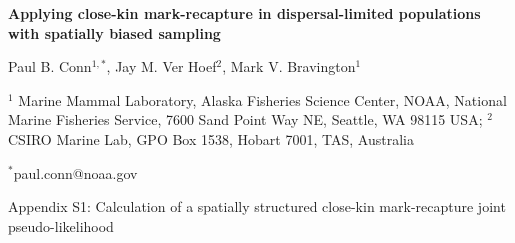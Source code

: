 \documentclass[times,mee,doublespace,]{besauth2}
\begin{document}
\begin{center} \bf {\large Applying close-kin mark-recapture in dispersal-limited populations with spatially biased sampling}

\rm

\vspace{0.7cm}
Paul B. Conn$^{1,*}$, Jay M. Ver Hoef$^2$, Mark V. Bravington$^1$
\end{center}
\vspace{0.5cm}

\rm
\small


$^1$ Marine Mammal Laboratory, Alaska Fisheries Science Center, NOAA, National Marine Fisheries Service, 7600 Sand Point Way NE, Seattle, WA 98115 USA; $^2$ CSIRO Marine Lab, GPO Box 1538, Hobart 7001, TAS, Australia

$^*$paul.conn@noaa.gov

\large
\bigskip
\centerline{Appendix S1: Calculation of a spatially structured close-kin mark-recapture joint pseudo-likelihood}
\bigskip
\small

\linenumbers

\def\VAR{{\rm Var}\,}
\def\COV{{\rm Cov}\,}
\def\Prob{{\rm P}\,}
\end{document}
